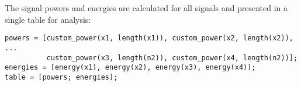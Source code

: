
\item[(f)]
The signal powers and energies are calculated for all signals and presented in a single table for analysis:

\begin{verbatim}
powers = [custom_power(x1, length(x1)), custom_power(x2, length(x2)), ...
          custom_power(x3, length(n2)), custom_power(x4, length(n2))];
energies = [energy(x1), energy(x2), energy(x3), energy(x4)];
table = [powers; energies];
\end{verbatim}
